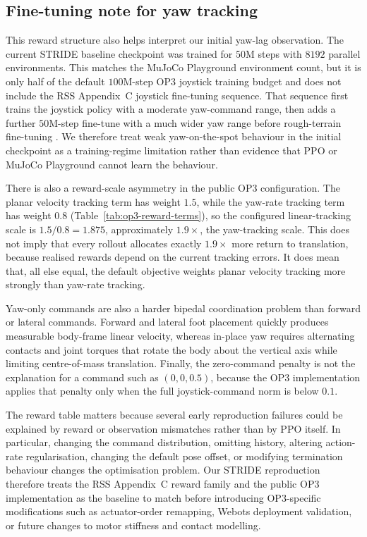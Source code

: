 \subsection{Fine-tuning note for yaw tracking}

This reward structure also helps interpret our initial yaw-lag observation. The current STRIDE baseline checkpoint was trained for $50$M steps with $8192$ parallel environments. This matches the MuJoCo Playground environment count, but it is only half of the default $100$M-step OP3 joystick training budget and does not include the RSS Appendix~C joystick fine-tuning sequence. That sequence first trains the joystick policy with a moderate yaw-command range, then adds a further $50$M-step fine-tune with a much wider yaw range before rough-terrain fine-tuning \citep{Zakka2025-demonstrating-mujoco-playground}. We therefore treat weak yaw-on-the-spot behaviour in the initial checkpoint as a training-regime limitation rather than evidence that PPO or MuJoCo Playground cannot learn the behaviour.

There is also a reward-scale asymmetry in the public OP3 configuration. The planar velocity tracking term has weight $1.5$, while the yaw-rate tracking term has weight $0.8$ (Table~\ref{tab:op3-reward-terms}), so the configured linear-tracking scale is $1.5/0.8=1.875$, approximately $1.9\times$, the yaw-tracking scale. This does not imply that every rollout allocates exactly $1.9\times$ more return to translation, because realised rewards depend on the current tracking errors. It does mean that, all else equal, the default objective weights planar velocity tracking more strongly than yaw-rate tracking.

Yaw-only commands are also a harder bipedal coordination problem than forward or lateral commands. Forward and lateral foot placement quickly produces measurable body-frame linear velocity, whereas in-place yaw requires alternating contacts and joint torques that rotate the body about the vertical axis while limiting centre-of-mass translation. Finally, the zero-command penalty is not the explanation for a command such as $(0,0,0.5)$, because the OP3 implementation applies that penalty only when the full joystick-command norm is below $0.1$.

The reward table matters because several early reproduction failures could be explained by reward or observation mismatches rather than by PPO itself. In particular, changing the command distribution, omitting history, altering action-rate regularisation, changing the default pose offset, or modifying termination behaviour changes the optimisation problem. Our STRIDE reproduction therefore treats the RSS Appendix~C reward family and the public OP3 implementation as the baseline to match before introducing OP3-specific modifications such as actuator-order remapping, Webots deployment validation, or future changes to motor stiffness and contact modelling.
